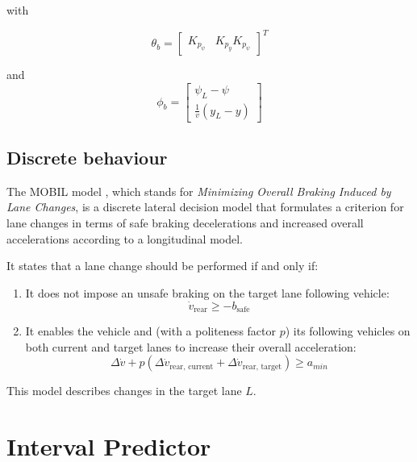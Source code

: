 \documentclass{article}
\begin{document}
with 

\begin{equation}
\theta_b = \begin{bmatrix} K_{p_\psi} & K_{p_y}K_{p_\psi}\end{bmatrix}^T
\end{equation}

and
\begin{equation}
\label{eq:phi_b}
\phi_b = \begin{bmatrix}
\psi_L-\psi\\
\frac{1}{v}(y_L-y)
\end{bmatrix}
\end{equation}

\subsection{Discrete behaviour}

The MOBIL model \citep{Kesting2007}, which stands for \textit{Minimizing Overall Braking Induced by Lane Changes}, is a discrete lateral decision model that formulates a criterion for lane changes in terms of safe braking decelerations and increased overall accelerations according to a longitudinal model.

It states that a lane change should be performed if and only if:
\begin{enumerate}
\item It does not impose an unsafe braking on the target lane following vehicle:
\begin{equation}
\dot{v}_\text{rear} \geq -b_{\text{safe}}
\end{equation}
\item It enables the vehicle and (with a politeness factor $p$) its following vehicles on both current and target lanes to increase their overall acceleration:
\begin{equation}
\Delta\dot{v} + p(\Delta\dot{v}_\text{rear, current} + \Delta\dot{v}_\text{rear, target}) \geq a_{min}
\end{equation}
\end{enumerate}

This model describes changes in the target lane $L$.


\section{Interval Predictor}

\label{interval-observer}
\end{document}
